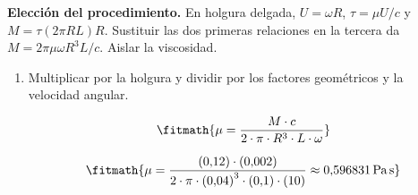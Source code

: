 \noindent\textbf{Elección del procedimiento.} En holgura delgada, $U=\omega R$, $\tau=\mu U/c$ y $M=\tau(2\pi RL)R$. Sustituir las dos primeras relaciones en la tercera da $M=2\pi\mu\omega R^3L/c$. Aislar la viscosidad.

\begin{enumerate}

\item Multiplicar por la holgura y dividir por los factores geométricos y la velocidad angular.

\[\fitmath{\mu=\frac{M\cdot c}{2\cdot \pi\cdot {R}^{3}\cdot L\cdot \omega}}\]

\[\fitmath{\mu=\frac{(0{,}12)\cdot (0{,}002)}{2\cdot \pi\cdot {(0{,}04)}^{3}\cdot (0{,}1)\cdot (10)}\approx 0{,}596831\,\mathrm{Pa\,s}}\]

\end{enumerate}

